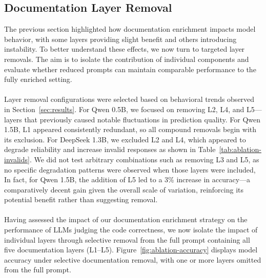 \documentclass[a4paper]{usiinfbachelorproject}
\begin{document}
\subsection{Documentation Layer Removal}
The previous section highlighted how documentation enrichment impacts model behavior, with some layers providing slight benefit and others introducing instability. To better understand these effects, we now turn to targeted layer removals. The aim is to isolate the contribution of individual components and evaluate whether reduced prompts can maintain comparable performance to the fully enriched setting.\\
\\
Layer removal configurations were selected based on behavioral trends observed in Section~\ref{sec:results}. For Qwen 0.5B, we focused on removing L2, L4, and L5—layers that previously caused notable fluctuations in prediction quality. For Qwen 1.5B, L1 appeared consistently redundant, so all compound removals begin with its exclusion. For DeepSeek 1.3B, we excluded L2 and L4, which appeared to degrade reliability and increase invalid responses as shown in Table~\ref{tab:ablation-invalids}. We did not test arbitrary combinations such as removing L3 and L5, as no specific degradation patterns were observed when those layers were included, In fact, for Qwen 1.5B, the addition of L5 led to a 3\% increase in accuracy—a comparatively decent gain given the overall scale of variation, reinforcing its potential benefit rather than suggesting removal. \\
\\
Having assessed the impact of our documentation enrichment strategy on the performance of LLMs judging the code correctness, we now isolate the impact of individual layers through selective removal from the full prompt containing all five documentation layers (L1–L5). Figure~\ref{fig:ablation-accuracy} displays model accuracy under selective documentation removal, with one or more layers omitted from the full prompt.\\
\end{document}
